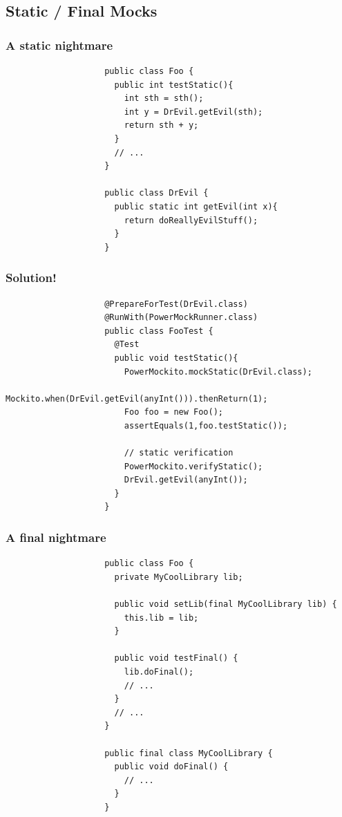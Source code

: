 \documentclass{beamer}
\begin{document}
		\subsection{Static / Final Mocks}

			\begin{frame}[fragile]
				\frametitle{A static nightmare}

				\begin{lstlisting}
					public class Foo {
					  public int testStatic(){
					    int sth = sth();
					    int y = DrEvil.getEvil(sth);	
					    return sth + y;
					  }
					  // ...
					}

					public class DrEvil {
					  public static int getEvil(int x){
					    return doReallyEvilStuff();
					  }
					}
				\end{lstlisting}
			\end{frame}

			\begin{frame}[fragile]
				\frametitle{Solution!}

				\begin{lstlisting}
					@PrepareForTest(DrEvil.class)
					@RunWith(PowerMockRunner.class)
					public class FooTest {
					  @Test
					  public void testStatic(){
					    PowerMockito.mockStatic(DrEvil.class);
					    Mockito.when(DrEvil.getEvil(anyInt())).thenReturn(1);
					    Foo foo = new Foo();
					    assertEquals(1,foo.testStatic());

					    // static verification
					    PowerMockito.verifyStatic();
					    DrEvil.getEvil(anyInt());
					  }
					}
				\end{lstlisting}
			\end{frame}

			\begin{frame}[fragile]
				\frametitle{A final nightmare}

				\begin{lstlisting}
					public class Foo {
					  private MyCoolLibrary lib;

					  public void setLib(final MyCoolLibrary lib) {
					    this.lib = lib;
					  }

					  public void testFinal() {
					    lib.doFinal();
					    // ...
					  }
					  // ...
					}

					public final class MyCoolLibrary {
					  public void doFinal() {
					    // ...
					  }
					}
				\end{lstlisting}
			\end{frame}
\end{document}
